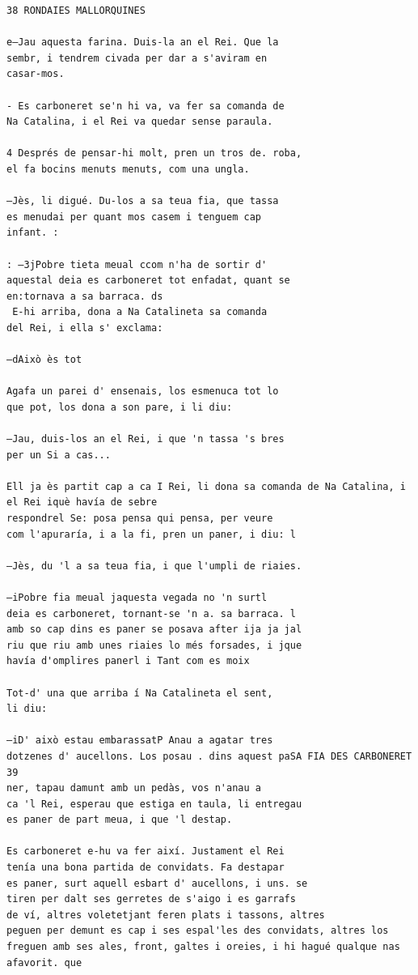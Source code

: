\documentclass[
  letterpaper,
  DIV=11,
  numbers=noendperiod]{scrreprt}
\begin{document}
\begin{verbatim}
38 RONDAIES MALLORQUINES

e—Jau aquesta farina. Duis-la an el Rei. Que la
sembr, i tendrem civada per dar a s'aviram en
casar-mos.

- Es carboneret se'n hi va, va fer sa comanda de
Na Catalina, i el Rei va quedar sense paraula.

4 Després de pensar-hi molt, pren un tros de. roba,
el fa bocins menuts menuts, com una ungla.

—Jès, li digué. Du-los a sa teua fia, que tassa
es menudai per quant mos casem i tenguem cap
infant. :

: —3jPobre tieta meual ccom n'ha de sortir d'
aquestal deia es carboneret tot enfadat, quant se
en:tornava a sa barraca. ds
 E-hi arriba, dona a Na Catalineta sa comanda
del Rei, i ella s' exclama:

—dAixò ès tot

Agafa un parei d' ensenais, los esmenuca tot lo
que pot, los dona a son pare, i li diu:

—Jau, duis-los an el Rei, i que 'n tassa 's bres
per un Si a cas...

Ell ja ès partit cap a ca I Rei, li dona sa comanda de Na Catalina, i el Rei iquè havía de sebre
respondrel Se: posa pensa qui pensa, per veure
com l'apuraría, i a la fi, pren un paner, i diu: l

—Jès, du 'l a sa teua fia, i que l'umpli de riaies.

—iPobre fia meual jaquesta vegada no 'n surtl
deia es carboneret, tornant-se 'n a. sa barraca. l
amb so cap dins es paner se posava after ija ja jal
riu que riu amb unes riaies lo més forsades, i jque
havía d'omplires panerl i Tant com es moix

Tot-d' una que arriba í Na Catalineta el sent,
li diu:

—iD' això estau embarassatP Anau a agatar tres
dotzenes d' aucellons. Los posau . dins aquest paSA FIA DES CARBONERET 39
ner, tapau damunt amb un pedàs, vos n'anau a
ca 'l Rei, esperau que estiga en taula, li entregau
es paner de part meua, i que 'l destap.

Es carboneret e-hu va fer així. Justament el Rei
tenía una bona partida de convidats. Fa destapar
es paner, surt aquell esbart d' aucellons, i uns. se
tiren per dalt ses gerretes de s'aigo i es garrafs
de ví, altres voletetjant feren plats i tassons, altres
peguen per demunt es cap i ses espal'les des convidats, altres los freguen amb ses ales, front, galtes i oreies, i hi hagué qualque nas afavorit. que


\end{verbatim}
\end{document}

